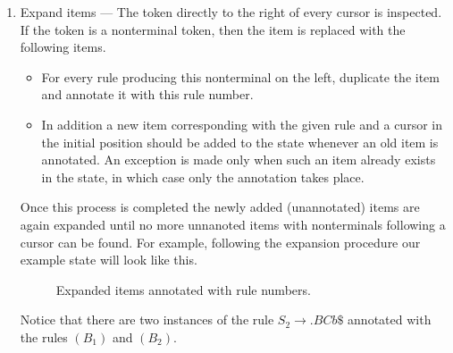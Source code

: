 \documentclass[envcountsame,runningheads]{llncs}
\begin{document}
\begin{enumerate}
\item Expand items --- The token directly to the right of every cursor is inspected. 
If the token is a nonterminal token, then the item is replaced with the following items.
\begin{itemize} 
\item For every rule producing this nonterminal on the left, duplicate the item and annotate it with this rule number.
\item In addition a new item corresponding with the given rule and a cursor in the initial position should be added to the state whenever an old item is annotated. 
An exception is made only when such an item already exists in the state, in which case only the annotation takes place.
\end{itemize}
Once this process is completed the newly added (unannotated) items are again expanded until no more unnanoted items with nonterminals following a cursor can be found. 
For example, following the expansion procedure our example state will look like this.

\begin{figure}[!ht]
\centering
{}
\caption{Expanded items annotated with rule numbers.}
\end{figure}

Notice that there are two instances of the rule $S_2 \rightarrow . B C b \$$ annotated with the rules $(B_1)$ and $(B_2)$.


\end{enumerate}
\end{document}
